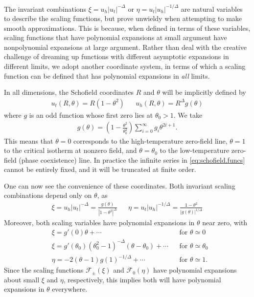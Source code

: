 \documentclass[
aps,
pre,
preprint,
longbibliography,
floatfix
]{revtex4-2}
\begin{document}
The invariant combinations $\xi=u_h|u_t|^{-\Delta}$ or
$\eta=u_t|u_h|^{-1/\Delta}$ are natural variables to describe the scaling
functions, but prove unwieldy when attempting to make smooth approximations.
This is because, when defined in terms of these variables, scaling functions
that have polynomial expansions at small argument have nonpolynomial expansions
at large argument. Rather than deal with the creative challenge of dreaming up
functions with different asymptotic expansions in different limits, we adopt
another coordinate system, in terms of which a scaling function can be defined
that has polynomial expansions in \emph{all} limits.

In all dimensions, the Schofield coordinates $R$ and $\theta$ will be implicitly defined by
\begin{align} \label{eq:schofield}
  u_t(R, \theta) = R(1-\theta^2)
  &&
  u_h(R, \theta) = R^{\Delta}g(\theta)
\end{align}
where $g$ is an odd function whose first zero lies at $\theta_0>1$. We take
\begin{align} \label{eq:schofield.funcs}
  g(\theta)=\left(1-\frac{\theta^2}{\theta_0^2}\right)\sum_{i=0}^\infty g_i\theta^{2i+1}.
\end{align}
This means that $\theta=0$ corresponds to the high-temperature zero-field line,
$\theta=1$ to the critical isotherm at nonzero field, and $\theta=\theta_0$ to
the low-temperature zero-field (phase coexistence) line.
In practice the infinite series in \eqref{eq:schofield.funcs} cannot be
entirely fixed, and it will be truncated at finite order.

One can now see the convenience of these coordinates. Both invariant scaling
combinations depend only on $\theta$, as
\begin{align}
  \xi=u_h|u_t|^{-\Delta}=\frac{g(\theta)}{|1-\theta^2|^{\Delta}} &&
  \eta=u_t|u_h|^{-1/\Delta}=\frac{1-\theta^2}{|g(\theta)|^{1/\Delta}}
\end{align}
Moreover, both scaling variables have polynomial expansions in $\theta$ near zero, with
\begin{align}
  &\xi= g'(0)\theta+\cdots  && \text{for $\theta\simeq0$}\\
  &\xi=g'(\theta_0)(\theta_0^2-1)^{-\Delta}(\theta-\theta_0)+\cdots && \text{for $\theta\simeq\theta_0$}
  \\
  &\eta=-2(\theta-1)g(1)^{-1/\Delta}+\cdots && \text{for $\theta\simeq1$}.
\end{align}
Since the scaling functions $\mathcal F_\pm(\xi)$ and $\mathcal F_0(\eta)$ have
polynomial expansions about small $\xi$ and $\eta$, respectively, this implies
both will have polynomial expansions in $\theta$ everywhere.
\end{document}
